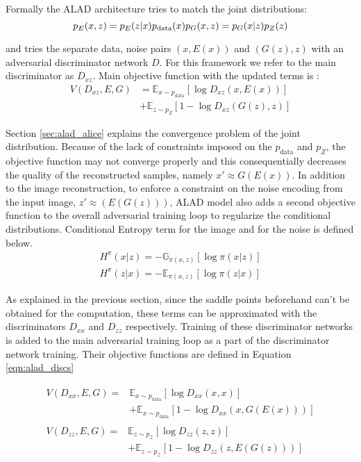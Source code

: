 {Formally the ALAD architecture tries to match the joint distributions: 
\begin{equation}
    p_{E} (x, z) = p_{E}(z | x) p_{\text{data}}(x) \\[5pt]
    p_{G} (x, z) = p_{G}(x | z) p_{Z}(z)
\end{equation}

and tries the separate data, noise pairs $(x, E(x))$ and $(G(z), z)$ with an adversarial
discriminator network $D$. For this framework we refer to the main discriminator as $D_{xz}$. Main
objective function with the updated terms is :
\begin{equation}
\begin{aligned} V\left(D_{x z}, E, G\right) &=\mathbb{E}_{x \sim p_{\text{data}}}\left[\log D_{x z}(x, E(x))\right] \\ &+\mathbb{E}_{z \sim p_{Z}}\left[1-\log D_{x z}(G(z), z)\right]
 \end{aligned}
\end{equation}

Section \ref{sec:alad_alice} explains the convergence problem of the joint distribution. Because of
the lack of constraints imposed on the $p_{\text{data}}$ and $p_{Z}$, the objective function may not
converge properly and this consequentially decreases the quality of the reconstructed samples,
namely $x' \approx G(E(x))$. In addition to the image reconstruction, to enforce a constraint on the
noise encoding from the input image, $z' \approx (E(G(z)))$, ALAD model also adds a second
objective function to the overall adversarial training loop to regularize the conditional
distributions. Conditional Entropy term for the image and for the noise is defined below.
\begin{align}
    H^{\pi}(x | z)=-\mathbb{G}_{\pi(x, z)}[\log \pi(x | z)] \\[5pt]
    H^{\pi}(z | x)=-\mathbb{E}_{\pi(x, z)}[\log \pi(z | x)] 
\end{align}

As explained in the previous section, since the saddle points beforehand can't be obtained for the
computation, these terms can be approximated with the discriminators $D_{xx}$ and $D_{zz}$
respectively. Training of these discriminator networks is added to the main adversarial training loop as
a part of the discriminator network training. Their objective functions are defined in Equation
\ref{eqn:alad_discs}

\begin{align}
    \label{eqn:alad_discs}
\begin{split} V\left(D_{x x}, E, G\right) ={}&\mathbb{E}_{x \sim p_{\text{data}}}\left[\log D_{x x}(x, x)\right] \\ &+\mathbb{E}_{x \sim p_{\text{data}}}\left[1-\log D_{x x}(x, G(E(x)))\right] \end{split}  \\[5pt]
\begin{split} V\left(D_{z z}, E, G\right) ={}&\mathbb{E}_{z \sim p_{\mathcal{Z}}}\left[\log D_{z z}(z, z)\right] \\ &+\mathbb{E}_{z \sim p_{\mathcal{Z}}}\left[1-\log D_{z z}(z, E(G(z)))\right] \end{split}    
\end{align}

}
